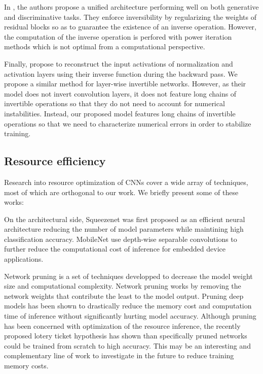 \documentclass[twocolumn]{bmcart}
\begin{document}
In \cite{behrmann2018invertible}, the authors propose a unified architecture performing well on both generative and discriminative tasks.
They enforce inversibility by regularizing the weights of residual blocks so as to guarantee the existence of an inverse operation.
However, the computation of the inverse operation is perfored with power iteration methods which is not optimal from a computational perspective.

Finally, \cite{rota2018place} propose to reconstruct the input activations of normalization and activation layers using their inverse function during the backward pass.
We propose a similar method for layer-wise invertible networks. 
However, as their model does not invert convolution layers, 
it does not feature long chains of invertible operations so that they do not  need to account for numerical instabilities.
Instead, our proposed model features long chains of invertible operations so that we need to characterize numerical errors in order to stabilize training.

\subsection{Resource efficiency}

Research into resource optimization of CNNs cover a wide array of techniques, most of which are orthogonal to our work. We briefly present some of these works:

On the architectural side, Squeezenet \cite{iandola2016squeezenet} was first proposed as an efficient neural architecture reducing the number of model parameters while maintining high classification accuracy.
MobileNet \cite{howard2017mobilenets} use depth-wise separable convolutions to further reduce the computational cost of inference for embedded device applications.

Network pruning is a set of techniques \cite{molchanov2016pruning} developped to decrease the model weight size and computational complexity.
Network pruning works by removing the network weights that contribute the least to the model output.
Pruning deep models has been shown to drastically reduce the memory cost and computation time of inference without  significantly hurting model accuracy.
Although pruning has been concerned with optimization of the resource inference, the recently proposed lotery ticket hypothesis \cite{frankle2018lottery} has shown than specifically pruned networks could  be trained from scratch to high accuracy. 
This may be an interesting and complementary line of work to investigate in the future to reduce training memory costs.
\end{document}

